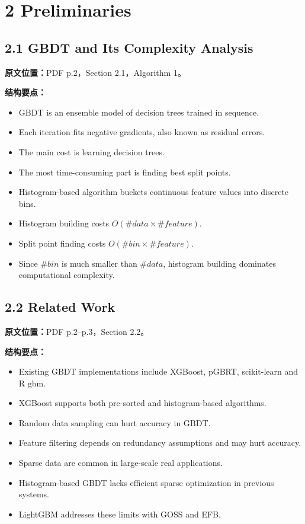 \section{2 Preliminaries}

\subsection{2.1 GBDT and Its Complexity Analysis}

\textbf{原文位置：}PDF p.2，Section 2.1，Algorithm 1。

\textbf{结构要点：}
\begin{itemize}
  \item GBDT is an ensemble model of decision trees trained in sequence.
  \item Each iteration fits negative gradients, also known as residual errors.
  \item The main cost is learning decision trees.
  \item The most time-consuming part is finding best split points.
  \item Histogram-based algorithm buckets continuous feature values into discrete bins.
  \item Histogram building costs $O(\#data\times \#feature)$.
  \item Split point finding costs $O(\#bin\times \#feature)$.
  \item Since $\#bin$ is much smaller than $\#data$, histogram building dominates computational complexity.
\end{itemize}

\subsection{2.2 Related Work}

\textbf{原文位置：}PDF p.2--p.3，Section 2.2。

\textbf{结构要点：}
\begin{itemize}
  \item Existing GBDT implementations include XGBoost, pGBRT, scikit-learn and R gbm.
  \item XGBoost supports both pre-sorted and histogram-based algorithms.
  \item Random data sampling can hurt accuracy in GBDT.
  \item Feature filtering depends on redundancy assumptions and may hurt accuracy.
  \item Sparse data are common in large-scale real applications.
  \item Histogram-based GBDT lacks efficient sparse optimization in previous systems.
  \item LightGBM addresses these limits with GOSS and EFB.
\end{itemize}

